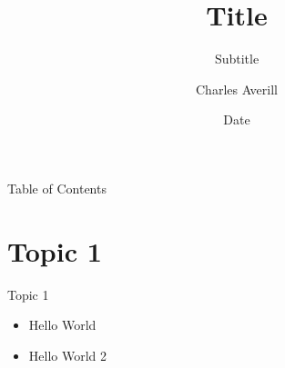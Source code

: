 \documentclass[aspectratio=43,t]{beamer}
\title{Title}
\subtitle{Subtitle}
\author{Charles Averill}
\institute[UTD]{
    \textcolor{white}{Organization} \\
    \textcolor{white}{The University of Texas at Dallas}
}
\date{Date}
\begin{document}
    
    \frame{\titlepage}
    
    \begin{frame}{Table of Contents}
        \tableofcontents
    \end{frame}
    
    \section{Topic 1}
    \begin{frame}{Topic 1}
        \begin{itemize}
            \item Hello World
            \item Hello World 2
        \end{itemize}
    \end{frame}
\end{document}
